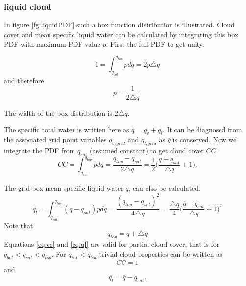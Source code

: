 \subsubsection{liquid cloud}

In figure \ref{fg:liquidPDF} such a box function distribution is illustrated.  Cloud cover
and mean specific liquid water can be calculated by integrating this box PDF with maximum 
PDF value $p$.  First the full PDF to get unity.

\begin{equation}
1 =  \int_{q_{bot}}^{q_{top}} p dq = 2 p \triangle q 
\end{equation}
and therefore
\begin{equation}
p = \frac{1}{2 \triangle q }.
\end{equation}

The width of the box distribution is $2 \triangle q$. 

The specific total water is written here as $\overline{q}=\overline{q_v} + \overline{q_l}$.  It can be diagnosed from the associated 
grid point variables $q_{v,grid}$ and $q_{l,grid}$ as $\overline{q}$ is conserved.  
Now we integrate the PDF from $q_{sat}$ (assumed constant) to get cloud cover $CC$
\begin{equation}
CC =  \int_{q_{sat}}^{q_{top}} p dq = \frac{q_{top}-q_{sat}}{2 \triangle q} 
= \frac{1}{2}\Big(\frac{\overline{q}-q_{sat}}{\triangle q}+1\Big).
\label{eq:cc}
\end{equation}

The grid-box mean specific liquid water $q_{l}$ can also be calculated.
\begin{equation}
\overline{q_l} =  \int_{q_{sat}}^{q_{top}} (q - q_{sat}) p dq = \frac{(q_{top}-q_{sat})^2}{4 \triangle q} 
= \frac{\triangle q}{4}\Big(\frac{\overline{q}-q_{sat}}{\triangle q}+1\Big)^2
\label{eq:ql}
\end{equation}
%
Note that 
\begin{equation}
q_{top} = \overline{q} + \triangle q 
\end{equation}
%
Equations \ref{eq:cc} and \ref{eq:ql} are valid for partial cloud cover, that is for $q_{bot} < q_{sat} < q_{top}$.
For $q_{sat} < q_{bot}$ trivial cloud properties can be written as
\begin{equation}
CC = 1
\end{equation}
and
\begin{equation}
\overline{q_l} =  \overline{q} - q_{sat}.
\end{equation}



